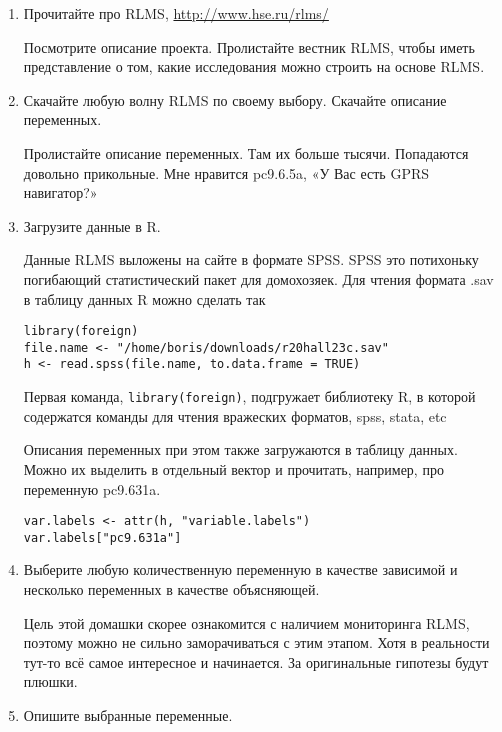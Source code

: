 \documentclass[12pt, a4paper]{article}
\theoremstyle{definition}
\begin{document}
\begin{enumerate}
\item Прочитайте про RLMS, \url{http://www.hse.ru/rlms/}

Посмотрите описание проекта. Пролистайте вестник RLMS, чтобы иметь представление о том, какие исследования можно строить на основе RLMS.

\item Скачайте любую волну RLMS по своему выбору. Скачайте описание переменных.

Пролистайте описание переменных. Там их больше тысячи. Попадаются довольно прикольные. Мне нравится pc9.6.5a, «У Вас есть GPRS навигатор?»

\item Загрузите данные в R.

Данные RLMS выложены на сайте в формате SPSS. SPSS это потихоньку погибающий статистический пакет для домохозяек. Для чтения формата .sav в таблицу данных R можно сделать так
\begin{verbatim}
library(foreign)
file.name <- "/home/boris/downloads/r20hall23c.sav"
h <- read.spss(file.name, to.data.frame = TRUE)
\end{verbatim}

Первая команда, \verb|library(foreign)|, подгружает библиотеку R, в которой содержатся команды для чтения вражеских форматов, spss, stata, etc

Описания переменных при этом также загружаются в таблицу данных.
Можно их выделить в отдельный вектор и прочитать, например, про переменную pc9.631a.
\begin{verbatim}
var.labels <- attr(h, "variable.labels")
var.labels["pc9.631a"]
\end{verbatim}

\item Выберите любую количественную переменную в качестве зависимой и несколько переменных в качестве объясняющей.

Цель этой домашки скорее ознакомится с наличием мониторинга RLMS, поэтому можно не сильно заморачиваться с этим этапом. Хотя в реальности тут-то всё самое интересное и начинается. За оригинальные гипотезы будут плюшки.

\item Опишите выбранные переменные.


\end{enumerate}
\end{document}
